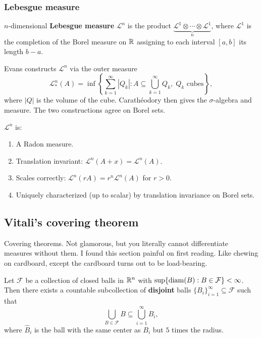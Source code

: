 \subsubsection{Lebesgue measure}\label{subsubsec:lebesgue}

\begin{definition}\label{def:lebesgue-measure}
$n$-dimensional \textbf{Lebesgue measure} $\mathcal{L}^n$ is the product
$\underbrace{\mathcal{L}^1 \otimes \cdots \otimes \mathcal{L}^1}_{n}$,
where $\mathcal{L}^1$ is the completion of the Borel measure on $\mathbb{R}$
assigning to each interval $[a,b]$ its length $b-a$.
\end{definition}

Evans constructs $\mathcal{L}^n$ via the outer measure
\[
  \mathcal{L}^n_*(A)
  = \inf\!\left\{ \sum_{k=1}^\infty |Q_k| :
    A \subseteq \bigcup_{k=1}^\infty Q_k,\; Q_k \text{ cubes}\right\},
\]
where $|Q|$ is the volume of the cube. Carath\'eodory then gives the
$\sigma$-algebra and measure. The two constructions agree on Borel sets.

\begin{fact}\label{fact:lebesgue-props}
$\mathcal{L}^n$ is:
\begin{enumerate}[nosep]
  \item A Radon measure.
  \item Translation invariant:
        $\mathcal{L}^n(A + x) = \mathcal{L}^n(A)$.
  \item Scales correctly:
        $\mathcal{L}^n(rA) = r^n \mathcal{L}^n(A)$ for $r > 0$.
  \item Uniquely characterized (up to scalar) by translation invariance
        on Borel sets.
\end{enumerate}
\end{fact}


\subsection{Vitali's covering theorem}\label{subsec:vitali}

Covering theorems. Not glamorous, but you literally cannot differentiate measures without them. I found this
section painful on first reading. Like chewing on cardboard, except the cardboard turns out to be load-bearing.

\begin{theorem}[Vitali]\label{thm:vitali}
Let $\mathcal{F}$ be a collection of closed balls in $\mathbb{R}^n$ with
$\sup\{\operatorname{diam}(B) : B \in \mathcal{F}\} < \infty$. Then there exists a
countable subcollection of \textbf{disjoint} balls
$\{B_i\}_{i=1}^\infty \subseteq \mathcal{F}$ such that
\[
  \bigcup_{B \in \mathcal{F}} B
    \subseteq \bigcup_{i=1}^\infty \hat{B}_i,
\]
where $\hat{B}_i$ is the ball with the same center as $B_i$ but $5$
times the radius.
\end{theorem}

